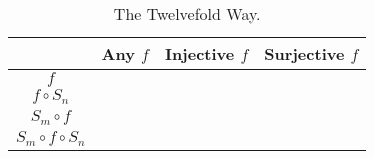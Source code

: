 
\begin{table}[H]
  \centering
  \begin{tabular}{|c||c|c|c|}
    \hline
      & Any $f$ & Injective $f$ & Surjective $f$ \\ \hline \hline
    $f$ &  &  &  \\ \hline
    $f \circ S_n$ &  &  &  \\ \hline
    $S_m \circ f$ &  &  &  \\ \hline
    $S_m \circ f \circ S_n$ &  &  &  \\ \hline
  \end{tabular}
  \caption{The Twelvefold Way.}
\end{table}